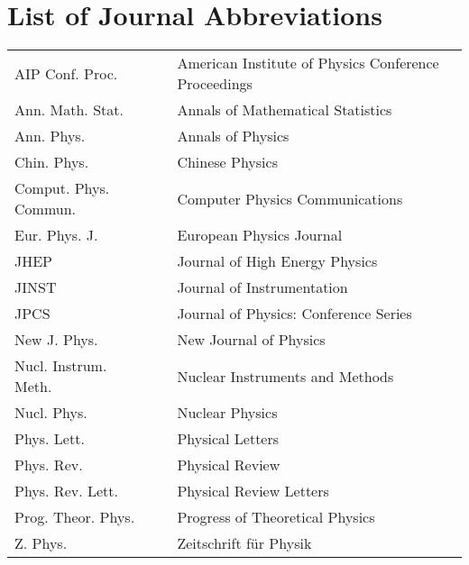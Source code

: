 
\chapter*{List of Journal Abbreviations}
\begin{center}
\begin{tabular}{lp{}p{}}
AIP Conf. Proc.      & \dotfill & American Institute of Physics Conference Proceedings\\
Ann. Math. Stat.     & \dotfill & Annals of Mathematical Statistics \\
Ann. Phys.           & \dotfill & Annals of Physics \\
Chin. Phys.          & \dotfill & Chinese Physics \\
Comput. Phys. Commun. & \dotfill & Computer Physics Communications \\
Eur. Phys. J.        & \dotfill & European Physics Journal \\
JHEP                 & \dotfill & Journal of High Energy Physics \\
JINST                & \dotfill & Journal of Instrumentation \\
JPCS                 & \dotfill & Journal of Physics: Conference Series \\
New J. Phys.         & \dotfill & New Journal of Physics \\
Nucl. Instrum. Meth. & \dotfill & Nuclear Instruments and Methods \\
Nucl. Phys.          & \dotfill & Nuclear Physics \\ 
Phys. Lett.          & \dotfill & Physical Letters \\
Phys. Rev.           & \dotfill & Physical Review \\
Phys. Rev. Lett.     & \dotfill & Physical Review Letters \\
Prog. Theor. Phys.   & \dotfill & Progress of Theoretical Physics \\
Z. Phys.             & \dotfill & Zeitschrift f{\"u}r Physik \\
\end{tabular}
\end{center}
